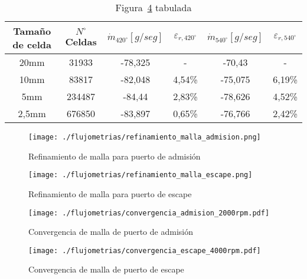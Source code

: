 \begin{table}
  \centering
  \begin{tabular}{cccccc}\toprule
    Tamaño de celda & $N^{\circ}$ Celdas & $\dot{m}_{420^{\circ}} [g/seg]$ & $\varepsilon_{r,420^{\circ}}$ & $\dot{m}_{540^{\circ}} [g/seg]$ & $\varepsilon_{r,540^{\circ}}$ \\ \midrule
    20mm  & 31933  & -78,325 & - & -70,43 & - \\
    10mm  & 83817  & -82,048 & 4,54\% & -75,075 & 6,19\% \\
    5mm   & 234487 & -84,44  & 2,83\% & -78,626 & 4,52\% \\
    2,5mm & 676850 & -83,897 & 0,65\% & -76,766 & 2,42\% \\ \bottomrule
  \end{tabular}
  \caption{Figura~\ref{fig:conv_malla_escape} tabulada}\label{tab:convergencia_malla_escape}
\end{table}

\begin{figure}
  \centering
  \texttt{[image: ./flujometrias/refinamiento\_malla\_admision.png]}
  \caption{Refinamiento de malla para puerto de admisión}\label{fig:refinamiento_admision}
\end{figure}

\begin{figure}
  \centering
  \texttt{[image: ./flujometrias/refinamiento\_malla\_escape.png]}
  \caption{Refinamiento de malla para puerto de escape}\label{fig:refinamiento_escape}
\end{figure}

\begin{figure}
  \centering
  \texttt{[image: ./flujometrias/convergencia\_admision\_2000rpm.pdf]}
  \caption{Convergencia de malla de puerto de admisión}\label{fig:conv_malla_admision}
\end{figure}

\begin{figure}
  \centering
  \texttt{[image: ./flujometrias/convergencia\_escape\_4000rpm.pdf]}
  \caption{Convergencia de malla de puerto de escape}\label{fig:conv_malla_escape}
\end{figure}




